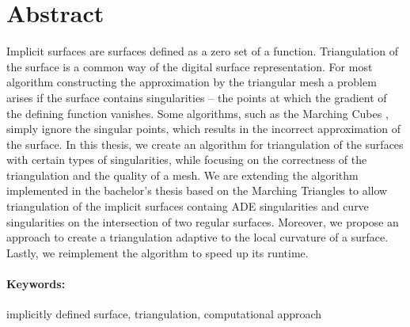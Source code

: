 \documentclass[12pt, twoside]{book}
\begin{document}
\section*{Abstract}
Implicit surfaces are surfaces defined as a zero set of a function.
Triangulation of the surface is a common way of the digital surface
representation.
For most algorithm constructing the approximation by the triangular mesh
a problem arises if the surface contains singularities -- the points at which 
the gradient of the defining function vanishes.
Some algorithms, such as the Marching Cubes \cite{lorensen1987marching},
simply ignore the singular points, which results in the incorrect approximation
of the surface.
In this thesis, we create an algorithm for triangulation of 
the surfaces with certain types of singularities, while focusing on the
correctness of the triangulation and the quality of a mesh.
We are extending the algorithm implemented in the bachelor's thesis 
\cite{korecova2021triangulation}
based on the Marching Triangles \cite{hilton1996marching} to allow 
triangulation of the implicit surfaces containg ADE singularities
and curve singularities on the intersection of two regular surfaces.
Moreover, we propose an approach to create a triangulation adaptive 
to the local curvature of a surface. Lastly, we reimplement the 
algorithm \cite{korecova2021triangulation} to speed up its runtime.
\paragraph*{Keywords:} implicitly defined surface, triangulation, computational approach


%
%



\newpage 

\tableofcontents

\end{document}
